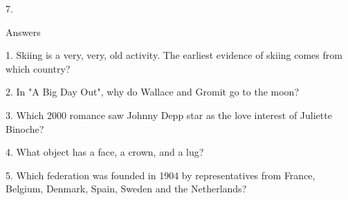\begin{frame}
\begin{center}
\Large
7. 
\end{center}
\end{frame}
\begin{frame}
\begin{center}
\Huge
Answers
\end{center}
\end{frame}
\begin{frame}
\begin{center}
\Large
1. Skiing is a very, very, old activity. The earliest evidence of skiing comes from which country?
\\
\end{center}
\end{frame}
\begin{frame}
\begin{center}
\Large
2. In "A Big Day Out", why do Wallace and Gromit go to the moon?
\\
\end{center}
\end{frame}
\begin{frame}
\begin{center}
\Large
3. Which 2000 romance saw Johnny Depp star as the love interest of Juliette Binoche?
\\
\end{center}
\end{frame}
\begin{frame}
\begin{center}
\Large
4. What object has a face, a crown, and a lug?
\\
\end{center}
\end{frame}
\begin{frame}
\begin{center}
\Large
5. Which federation was founded in 1904 by representatives from France, Belgium, Denmark, Spain, Sweden and the Netherlands?
\\
\end{center}
\end{frame}
